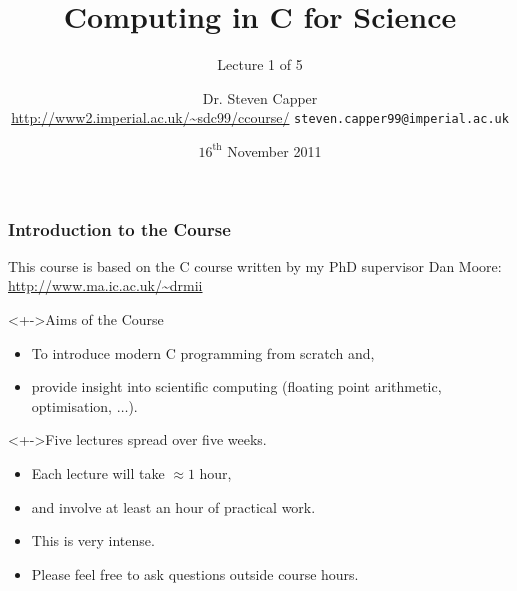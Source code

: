 \documentclass[table]{beamer}
\let\oldurl=\url
\renewcommand{\url}[1]{\textcolor{blue}{\oldurl{#1}}}
\begin{document}

\title[C for Science - Lecture 1]{Computing in C for Science}
\subtitle{Lecture 1 of 5}

\author[Steven Capper]{Dr. Steven Capper \\ \url{http://www2.imperial.ac.uk/~sdc99/ccourse/}
{\tt steven.capper99@imperial.ac.uk}}

\date{$16^\text{th}$ November 2011 }

\subject{C for Science} %
{
\begin{frame}
  \titlepage
\end{frame}
}


\begin{frame}
\frametitle{Introduction to the Course}
This course is based on the C course written by my PhD supervisor Dan Moore:
\url{http://www.ma.ic.ac.uk/~drmii}
\begin{block}<+->{Aims of the Course}
\begin{itemize}
\item To introduce modern C programming from scratch and,
\item provide insight into scientific computing (floating point arithmetic, optimisation, $\ldots$).
\end{itemize}
\end{block}

\begin{block}<+->{Five lectures spread over five weeks.}
\begin{itemize}
\item Each lecture will take $\approx 1$ hour,
\item and involve at least an hour of practical work.
\item This is very intense.
\item Please feel free to ask questions outside course hours.
\end{itemize}
\end{block}
\end{frame}
\end{document}
